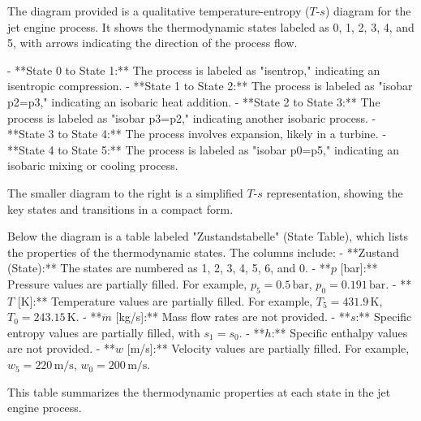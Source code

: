 The diagram provided is a qualitative temperature-entropy (\(T\)-\(s\)) diagram for the jet engine process. It shows the thermodynamic states labeled as 0, 1, 2, 3, 4, and 5, with arrows indicating the direction of the process flow.  

- **State 0 to State 1:** The process is labeled as "isentrop," indicating an isentropic compression.  
- **State 1 to State 2:** The process is labeled as "isobar p2=p3," indicating an isobaric heat addition.  
- **State 2 to State 3:** The process is labeled as "isobar p3=p2," indicating another isobaric process.  
- **State 3 to State 4:** The process involves expansion, likely in a turbine.  
- **State 4 to State 5:** The process is labeled as "isobar p0=p5," indicating an isobaric mixing or cooling process.  

The smaller diagram to the right is a simplified \(T\)-\(s\) representation, showing the key states and transitions in a compact form.  

Below the diagram is a table labeled "Zustandstabelle" (State Table), which lists the properties of the thermodynamic states. The columns include:  
- **Zustand (State):** The states are numbered as 1, 2, 3, 4, 5, 6, and 0.  
- **\(p\) [bar]:** Pressure values are partially filled. For example, \(p_5 = 0.5 \, \text{bar}\), \(p_0 = 0.191 \, \text{bar}\).  
- **\(T\) [K]:** Temperature values are partially filled. For example, \(T_5 = 431.9 \, \text{K}\), \(T_0 = 243.15 \, \text{K}\).  
- **\(\dot{m}\) [kg/s]:** Mass flow rates are not provided.  
- **\(s\):** Specific entropy values are partially filled, with \(s_1 = s_0\).  
- **\(h\):** Specific enthalpy values are not provided.  
- **\(w\) [m/s]:** Velocity values are partially filled. For example, \(w_5 = 220 \, \text{m/s}\), \(w_0 = 200 \, \text{m/s}\).  

This table summarizes the thermodynamic properties at each state in the jet engine process.